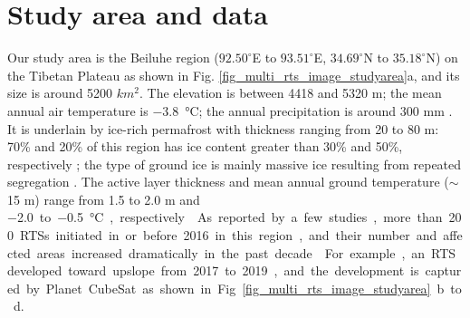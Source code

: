 \documentclass[authoryear,preprint,review,12pt]{elsarticle}
\begin{document}
\section{Study area and data}
\label{sec_studyarea_data}

Our study area is the Beiluhe region ($92.50^\circ$E to $93.51^\circ$E, $34.69^\circ$N to $35.18^\circ$N) on the Tibetan Plateau as shown in Fig. \ref{fig_multi_rts_image_studyarea}a, and its size is around 5200 $km^2$.
The elevation is between 4418 and 5320 m; the mean annual air temperature is \SI{-3.8}{\celsius}; the annual precipitation is around 300 mm  \citep{luo_thermokarst_2015}.
It is underlain by ice-rich permafrost with thickness ranging from 20 to 80 m: 70\% and 20\% of this region has ice content greater than 30\% and 50\%, respectively \citep{zhou_geocryology_2000, luo_thermokarst_2015}; 
the type of ground ice is mainly massive ice resulting from repeated segregation \citep{guodong1983mechanism}. 
The active layer thickness and mean annual ground temperature ($\sim$15 m) range from 1.5 to 2.0 m and \SI{-2.0} to \SI{-0.5}{\celsius}, respectively \citep{zhou_geocryology_2000, wu2010changes, luo_thermokarst_2015,  wu2015changes}. 
As reported by a few studies, more than 200 RTSs initiated in or before 2016 in this region,  and their number and affected areas increased dramatically in the past decade \citep{luo2019recent}.  
For example, an RTS developed toward upslope from 2017 to 2019, and the development is captured by Planet CubeSat as shown in Fig. \ref{fig_multi_rts_image_studyarea}b to d. 

\end{document}
